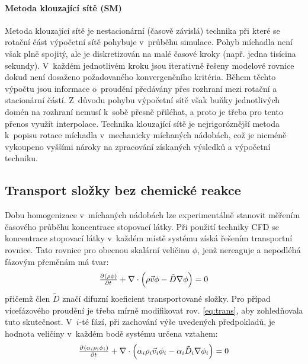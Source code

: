 \paragraph{Metoda klouzající sítě (SM)}
Metoda klouzající sítě je nestacionární (časově závislá) technika při které se rotační část výpočetní sítě pohybuje v~průběhu simulace. Pohyb míchadla není však plně spojitý, ale je diskretizován na malé časové kroky (např. jedna tisícina sekundy). V~každém jednotlivém kroku jsou iterativně řešeny modelové rovnice dokud není dosaženo požadovaného konvergenčního kritéria. Během těchto výpočtu jsou informace o~proudění předávány přes rozhraní mezi rotační a stacionární částí. Z~důvodu pohybu výpočetní sítě však buňky jednotlivých domén na rozhraní nemusí k~sobě přesně přiléhat, a proto je třeba pro tento přenos využít interpolace. Technika klouzající sítě je nejrigoróznější metoda k~popisu rotace míchadla v~mechanicky míchaných nádobách, což je nicméně vykoupeno vyššími nároky na zpracování získaných výsledků a výpočetní techniku. 

\subsection{Transport složky bez chemické reakce}
Dobu homogenizace v~míchaných nádobách lze experimentálně stanovit měřením časového průběhu koncentrace stopovací látky. Při použití techniky CFD se koncentrace stopovací látky v~každém místě systému získá řešením transportní rovnice. Tato rovnice pro obecnou skalární veličinu $\phi$, jenž nereaguje a nepodléhá fázovým přeměnám má tvar: 
\begin{equation}
	\pd{\kula{\rho \phi}}{t} + \nabla \cdot \kula{\rho\vec{v}\phi - \tilde{D}\nabla\phi} = 0
	\label{eq:trans}
\end{equation}  
přičemž člen $\tilde{D}$ značí difuzní koeficient transportované složky. Pro případ vícefázového proudění je třeba mírně modifikovat rov. \ref{eq:trans}, aby zohledňovala tuto skutečnost. V~$i$-té fází, při zachování výše uvedených předpokladů, je hodnota veličiny v~každém bodě systému určena vztahem:
\begin{equation}
	\pd{\kula{\alpha_{i} \rho_{i} \phi_{i}}}{t} + \nabla \cdot \kula{\alpha_{i} \rho_{i}\vec{v}_{i}\phi_{i} - \alpha_{i} \tilde{D}_{i}\nabla\phi_{i}} = 0
	\label{eq:trans_mix}
\end{equation}  
